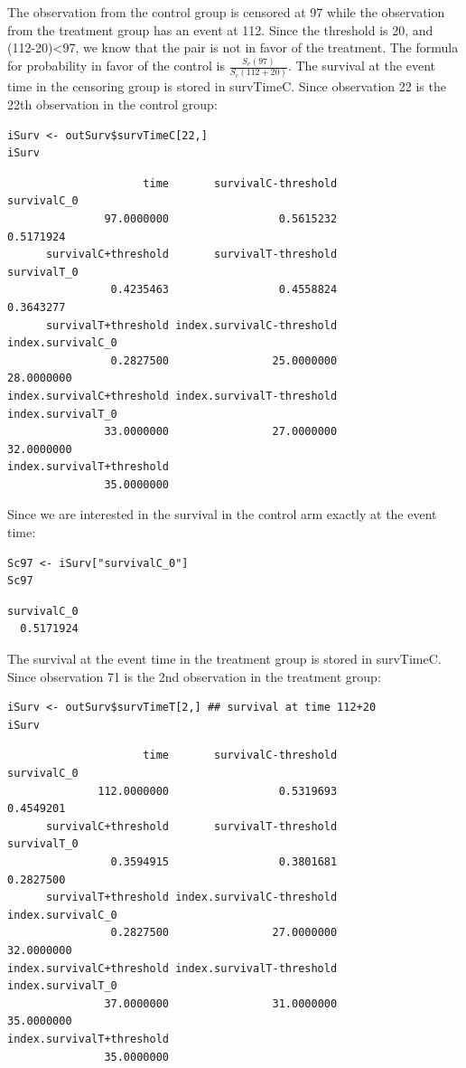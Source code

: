 \documentclass[12pt]{article}
\begin{document}
The observation from the control group is censored at 97 while the
observation from the treatment group has an event at 112. Since the
threshold is 20, and (112-20)<97, we know that the pair is not in
favor of the treatment. The formula for probability in favor of the
control is \(\frac{S_c(97)}{S_c(112+20)}\). The survival at the event
time in the censoring group is stored in survTimeC. Since observation
22 is the 22th observation in the control group:
\lstset{language=r,label= ,caption= ,captionpos=b,numbers=none}
\begin{lstlisting}
iSurv <- outSurv$survTimeC[22,] 
iSurv
\end{lstlisting}

\begin{verbatim}
                     time       survivalC-threshold               survivalC_0 
               97.0000000                 0.5615232                 0.5171924 
      survivalC+threshold       survivalT-threshold               survivalT_0 
                0.4235463                 0.4558824                 0.3643277 
      survivalT+threshold index.survivalC-threshold         index.survivalC_0 
                0.2827500                25.0000000                28.0000000 
index.survivalC+threshold index.survivalT-threshold         index.survivalT_0 
               33.0000000                27.0000000                32.0000000 
index.survivalT+threshold 
               35.0000000
\end{verbatim}

Since we are interested in the survival in the control arm exactly at the event time:
\lstset{language=r,label= ,caption= ,captionpos=b,numbers=none}
\begin{lstlisting}
Sc97 <- iSurv["survivalC_0"] 
Sc97
\end{lstlisting}

\begin{verbatim}
survivalC_0 
  0.5171924
\end{verbatim}


The survival at the event time in the treatment group is stored in
survTimeC. Since observation 71 is the 2nd observation in the treatment
group:
\lstset{language=r,label= ,caption= ,captionpos=b,numbers=none}
\begin{lstlisting}
iSurv <- outSurv$survTimeT[2,] ## survival at time 112+20
iSurv
\end{lstlisting}

\begin{verbatim}
                     time       survivalC-threshold               survivalC_0 
              112.0000000                 0.5319693                 0.4549201 
      survivalC+threshold       survivalT-threshold               survivalT_0 
                0.3594915                 0.3801681                 0.2827500 
      survivalT+threshold index.survivalC-threshold         index.survivalC_0 
                0.2827500                27.0000000                32.0000000 
index.survivalC+threshold index.survivalT-threshold         index.survivalT_0 
               37.0000000                31.0000000                35.0000000 
index.survivalT+threshold 
               35.0000000
\end{verbatim}
\end{document}
